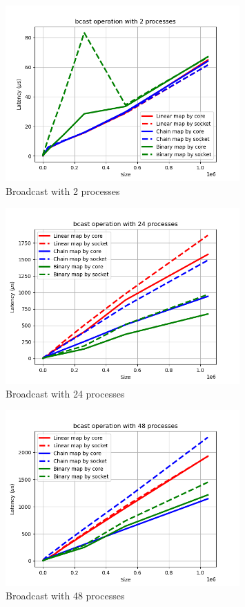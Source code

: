 \begin{figure}[h!]
    \centering
    \includegraphics[width=0.8\textwidth]{../plots/bcast_fixedProcesses2.png}
    \caption{Broadcast with 2 processes}
    \label{fig:broadcast_fixed_processes_2}
\end{figure}

\begin{figure}[h!]
    \centering
    \includegraphics[width=0.8\textwidth]{../plots/bcast_fixedProcesses24.png}
    \caption{Broadcast with 24 processes}
    \label{fig:broadcast_fixed_processes_24}
\end{figure}

\begin{figure}[h!]
    \centering
    \includegraphics[width=0.8\textwidth]{../plots/bcast_fixedProcesses48.png}
    \caption{Broadcast with 48 processes}
    \label{fig:broadcast_fixed_processes_48}
\end{figure}



